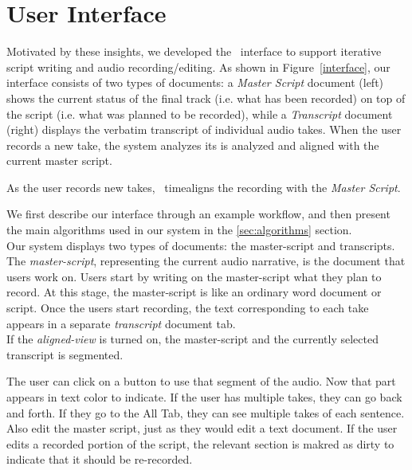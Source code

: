 \section{User Interface}
Motivated by these insights, we developed the \systemname\  interface to support iterative script writing and  audio recording/editing. As shown in Figure~\ref{interface}, our interface
consists of two types of documents: a \textit{Master Script} document (left) shows the current status of the final track (i.e. what has been recorded) on top of the script (i.e. what was planned to be recorded), while a \textit{Transcript} document (right) displays the verbatim transcript of individual audio takes. When the user records a new take, the system analyzes its  is analyzed and aligned with the current master script. 

As the user records new takes, \systemname\ timealigns
the recording with the \textit {Master Script}. 

We first describe our interface through an example workflow, and then present the main algorithms used in our system in the \ref{sec:algorithms} section.\\
 Our system displays two types of documents: the master-script and transcripts. The \textit{master-script}, representing the current audio narrative, is the document that users work on. Users start by writing on the master-script what they plan to
record. At this stage, the master-script is like an ordinary
word document or script. Once the users start recording, the text corresponding to each take appears in a separate \textit{transcript} document tab.\\
If the \textit{aligned-view} is turned on, the master-script and the currently selected transcript is segmented.

The user can click on a button to use that segment of the audio. Now that part appears in text color to indicate. If the user has multiple takes, they can go back and forth. If they go to the All Tab, they can see multiple takes of each sentence.
Also edit the master script, just as they would edit a text document. If the user edits a recorded portion of the script, the relevant section is makred as dirty to indicate that it should be re-recorded.

